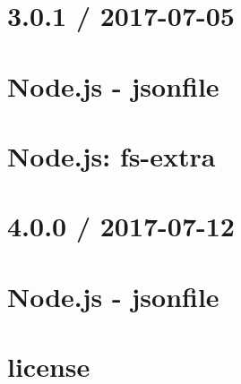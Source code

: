\documentclass[twoside]{book}
\newcommand{\+}{\discretionary{\mbox{\scriptsize$\hookleftarrow$}}{}{}}
\begin{document}
\chapter{3.0.1 / 2017-\/07-\/05}
\label{md_dsmacc_vis_degree_node_modules_electron-packager_node_modules_fs-extra_node_modules_jsonfile_CHANGELOG}

\chapter{Node.\+js -\/ jsonfile}
\label{md_dsmacc_vis_degree_node_modules_electron-packager_node_modules_fs-extra_node_modules_jsonfile_README}

\chapter{Node.\+js\+: fs-\/extra}
\label{md_dsmacc_vis_degree_node_modules_electron-packager_node_modules_fs-extra_README}

\chapter{4.0.0 / 2017-\/07-\/12}
\label{md_dsmacc_vis_degree_node_modules_electron-packager_node_modules_jsonfile_CHANGELOG}

\chapter{Node.\+js -\/ jsonfile}
\label{md_dsmacc_vis_degree_node_modules_electron-packager_node_modules_jsonfile_README}

\chapter{license}
\label{md_dsmacc_vis_degree_node_modules_electron-packager_node_modules_ms_license}

\end{document}
